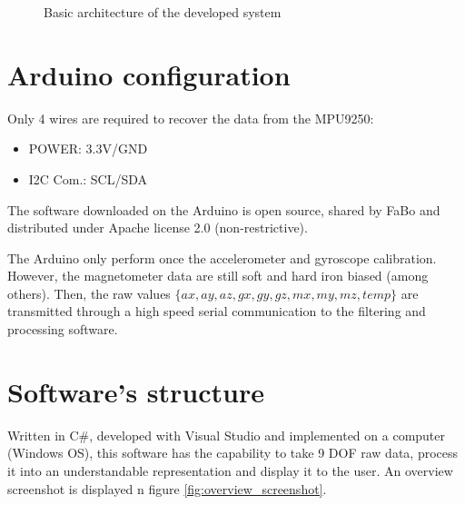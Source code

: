 \documentclass{article}
\begin{document}
\begin{figure}[ht]
    \centering
    \caption{Basic architecture of the developed system}
    \label{fig:basic_architecture}
\end{figure}

\section{Arduino configuration}

Only 4 wires are required to recover the data from the MPU9250:
\begin{itemize}
    \item POWER: 3.3V/GND
    \item I2C Com.: SCL/SDA
\end{itemize}

The software downloaded on the Arduino \cite{fabo_library} is open source, shared by FaBo and distributed under Apache license 2.0 (non-restrictive).

\vspace{\baselineskip}

The Arduino only perform once the accelerometer and gyroscope calibration. However, the magnetometer data are still soft and hard iron biased (among others). Then, the raw values $\{ax, ay, az, gx, gy, gz, mx, my, mz, temp\}$ are transmitted through a high speed serial communication to the filtering and processing software. 

\section{Software's structure}

Written in C\#, developed with Visual Studio and implemented on a computer (Windows OS), this software has the capability to take 9 DOF raw data, process it into an understandable representation and display it to the user. An overview screenshot is displayed n figure \ref{fig:overview_screenshot}. 
\end{document}
